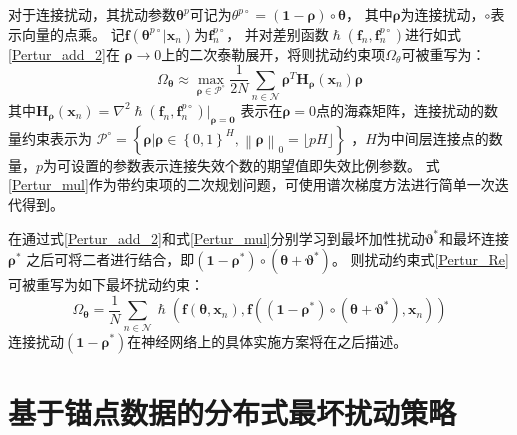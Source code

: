 对于连接扰动，其扰动参数$\boldsymbol\theta^p$可记为$\theta^{p\circ }=\left(\boldsymbol 1-\boldsymbol\rho\right)\circ\boldsymbol\theta$，
其中$\boldsymbol\rho$为连接扰动，$\circ$表示向量的点乘。
记$\boldsymbol f\left(\boldsymbol\theta^{p\circ}|\boldsymbol x_n\right)$为$\boldsymbol f_n^{p\circ}$，
并对差别函数$\hslash\left(\boldsymbol f_n,\boldsymbol f_n^{p\circ}\right)$进行如式\eqref{Pertur_add_2}在
$\boldsymbol \rho \to 0$上的二次泰勒展开，将则扰动约束项$\Omega_{\theta}$可被重写为：
\begin{equation}
    \label{Pertur_mul}
    \Omega_{\boldsymbol\theta}\approx \max _{\boldsymbol\rho \in \mathcal{P}^\circ}
    \frac{1}{2N}  \sum_{n \in \mathcal{N}} {\boldsymbol\rho}^T
    \boldsymbol H_{\boldsymbol\rho}\left(\boldsymbol x_n\right)
    \boldsymbol\rho
\end{equation}
其中$\boldsymbol H_{\boldsymbol\rho}\left(\boldsymbol x_n\right)=\nabla^2\hslash\left(\boldsymbol f_n,
\boldsymbol f_n^{p\circ}\right)\left.\right|_{\boldsymbol \rho=\boldsymbol0}$
表示在$\boldsymbol \rho=0$点的海森矩阵，连接扰动的数量约束表示为
$\mathcal{P}^\circ=\left\{\boldsymbol \rho| \boldsymbol \rho \in \left\{0,1\right\}^H,
 \left\| \boldsymbol\rho\right\|_0=\lfloor pH\rfloor \right\}$
，$H$为中间层连接点的数量，$p$为可设置的参数表示连接失效个数的期望值即失效比例参数。
式\eqref{Pertur_mul}作为带约束项的二次规划问题，可使用谱次梯度方法进行简单一次迭代得到\cite{Olsson_BQP_2007, Zhang_WCP_2020}。

在通过式\eqref{Pertur_add_2}和式\eqref{Pertur_mul}分别学习到最坏加性扰动$\boldsymbol \vartheta^* $和最坏连接$\boldsymbol \rho^*$
之后可将二者进行结合，即$\left(\boldsymbol 1-\boldsymbol \rho^*\right)\circ\left(\boldsymbol \theta+\boldsymbol \vartheta^* \right)$。
则扰动约束式\eqref{Pertur_Re}可被重写为如下最坏扰动约束：
\begin{equation}
    \label{Pertur_add_mul}
    \Omega_{\boldsymbol\theta}= \frac{1}{N} \sum_{n \in \mathcal{N}}
    \hslash\left(\boldsymbol f\left(\boldsymbol\theta,\boldsymbol x_n\right),
    \boldsymbol f\left(\left(\boldsymbol 1-\boldsymbol \rho^*\right)\circ\left(\boldsymbol \theta+\boldsymbol \vartheta^* \right),\boldsymbol x_n\right)\right)
\end{equation}
连接扰动$\left(\boldsymbol 1-\boldsymbol \rho^*\right)$在神经网络上的具体实施方案将在之后描述。

\section{基于锚点数据的分布式最坏扰动策略}\label{Char4_Distributed}

